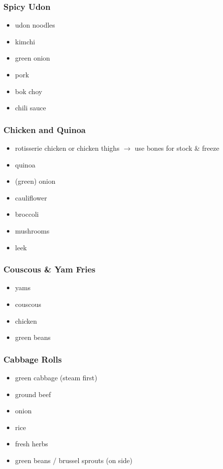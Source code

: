 \documentclass[11pt, a4paper]{article}
\begin{document}
\subsubsection{Spicy Udon}
\vspace{1pc}
\begin{itemize}
\item udon noodles
\item kimchi
\item green onion
\item pork
\item bok choy
\item chili sauce
\end{itemize} 



\subsubsection{Chicken and Quinoa}
\vspace{1pc}
\begin{itemize}
\item rotisserie chicken or chicken thighs $\longrightarrow$ use bones for stock \& freeze
\item quinoa
\item (green) onion
\item cauliflower
\item broccoli
\item mushrooms
\item leek
\end{itemize}




\subsubsection{Couscous \& Yam Fries}
\vspace{1pc}
\begin{itemize}
\item yams
\item couscous
\item chicken
\item green beans
\end{itemize}




\subsubsection{Cabbage Rolls}
\vspace{1pc}
\begin{itemize}
\item green cabbage (steam first)
\item ground beef
\item onion
\item rice
\item fresh herbs
\item green beans / brussel sprouts (on side)
\end{itemize}
\end{document}
